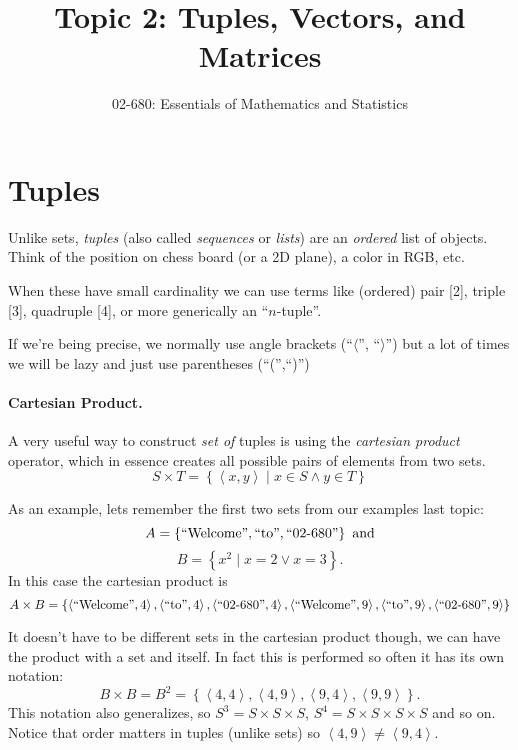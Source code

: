 \documentclass[11pt, oneside]{article}   	%
\title{Topic 2: Tuples, Vectors, and Matrices}
\author{02-680: Essentials of Mathematics and Statistics}
\begin{document}
\maketitle

\section{Tuples}
Unlike sets, \emph{tuples} (also called \emph{sequences} or \emph{lists}) are an \textit{ordered} list of objects.
Think of the position on chess board (or a 2D plane), a color in RGB, etc. 

When these have small cardinality we can use terms like (ordered) pair [2], triple [3], quadruple [4], or more generically an ``$n$-tuple''.

If we're being precise, we normally use angle brackets (``$\langle$'', ``$\rangle$'') but a lot of times we will be lazy and just use parentheses (``('',``)'')

\paragraph{Cartesian Product.}
A very useful way to construct \emph{set of} tuples is using the \emph{cartesian product} operator, 
which in essence creates all possible pairs of elements from two sets.
\[
S \times T = \left\{\left\langle x,y\right\rangle \mid x \in S \wedge y\in T\right\}
\]

As an example, lets remember the first two sets from our examples last topic: 
\[
A = \left\{\textnormal{``Welcome''}, \textnormal{``to''}, \textnormal{``02-680''}\right\} \textnormal{ and}
\]\[
B = \left\{x^2 \mid x=2 \vee x=3 \right\}.
\]
In this case the cartesian product is 
\[
A \times B = \left\{ \left\langle\textnormal{``Welcome''},4\right\rangle, \left\langle\textnormal{``to''},4\right\rangle, \left\langle\textnormal{``02-680''},4\right\rangle,
 \left\langle\textnormal{``Welcome''},9\right\rangle, \left\langle\textnormal{``to''},9\right\rangle, \left\langle\textnormal{``02-680''},9\right\rangle \right\}
\]

It doesn't have to be different sets in the cartesian product though, we can have the product with a set and itself.
In fact this is performed so often it has its own notation:
\[
B \times B = B^2 = \left\{ \left\langle 4,4 \right\rangle, \left\langle 4,9 \right\rangle,  \left\langle 9,4 \right\rangle, \left\langle 9,9 \right\rangle \right\}.
\]
This notation also generalizes, so $S^3 = S \times S \times S$, $S^4 = S\times S\times S\times S$ and so on. 
Notice that order matters in tuples (unlike sets) so $ \left\langle 4,9 \right\rangle \neq \left\langle 9,4 \right\rangle$.
\end{document}
